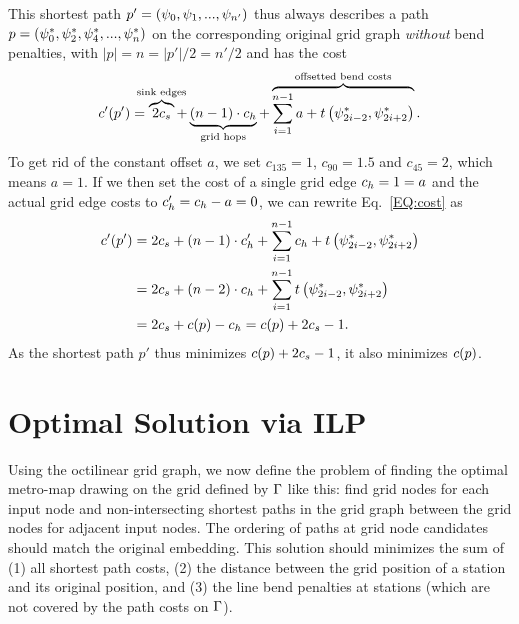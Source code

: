\documentclass[sigconf]{acmart}
\begin{document}
This shortest path $p' = (\psi_0, \psi_1, ..., \psi_{n'})$ thus always describes a path $p = (\psi^*_0, \psi^*_2, \psi^*_4, ..., \psi^*_{n})$ on the corresponding original grid graph \emph{without} bend penalties, with $|p| = n = |p'| / 2 = n' / 2$ and has the cost
%
\begin{align}
	\gPcostOcti{\gPathOcti} = \overbrace{2 \gSinkcost}^{\makebox[0pt]{$\scriptstyle{\text{sink edges}}$}} + \underbrace{\left(n - 1\right) \cdot \gHopcost}_{\makebox[0pt]{$\scriptstyle{\text{grid hops}}$}} + \overbrace{\sum_{i=1}^{n - 1} a + t\left(\gv^*_{2i - 2}, \gv^*_{2i+2}\right)}^{\makebox[0pt]{$\scriptstyle{\text{offsetted bend costs}}$}}\label{EQ:cost}.
\end{align}
%
To get rid of the constant offset $a$, we set $c_{135} = 1$, $c_{90} = 1.5$ and $c_{45} = 2$, which means $a = 1$.
If we then set the cost of a single grid edge $c_h = 1 = a$ and the actual grid edge costs to $c'_h = c_h - a = 0$, we can rewrite Eq.~\ref{EQ:cost} as  
%
\begin{align}
	c'(p') &= 2 c_s +  \left(n - 1\right) \cdot c'_h + \sum_{i=1}^{n - 1} c_h + t\left(\psi^*_{2i - 2}, \psi^*_{2i+2}\right) \\
	     &= 2 c_s + \left(n - 2\right) \cdot c_h + \sum_{i=1}^{n - 1} t \left(\psi^*_{2i - 2}, \psi^*_{2i+2}\right) \\
	     &= 2 c_s + c(p) - c_h = c(p) + 2 c_s - 1.
\end{align}
%
As the shortest path $p'$ thus minimizes $c(p) + 2 c_s - 1$, it also minimizes $c(p)$.

\section{Optimal Solution via ILP}

Using the octilinear grid graph, we now define the problem of finding the optimal metro-map drawing on the grid defined by $\Gamma$ like this: find grid nodes for each input node and non-intersecting shortest paths in the grid graph between the grid nodes for adjacent input nodes.
The ordering of paths at grid node candidates should match the original embedding.
This solution should minimizes the sum of (1) all shortest path costs, (2) the distance between the grid position of a station and its original position, and (3) the line bend penalties at stations (which are not covered by the path costs on $\Gamma$).
\end{document}

